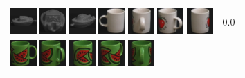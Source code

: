 \begin{figure}[tbp]
\begin{center}
\begin{tabular}{m{11cm} | m{3cm} |}
\includegraphics[width=1cm]{coil/beeld-27.eps}
\includegraphics[width=1cm]{coil/beeld-26.eps}
\includegraphics[width=1cm]{coil/beeld-29.eps}
\includegraphics[width=1cm]{coil/beeld-37.eps}
\includegraphics[width=1cm]{coil/beeld-41.eps}
\includegraphics[width=1cm]{coil/beeld-40.eps}
\includegraphics[width=1cm]{coil/beeld-38.eps}
& {\scriptsize 0.0}
\\
\includegraphics[width=1cm]{coil/beeld-30.eps}
\includegraphics[width=1cm]{coil/beeld-34.eps}
\includegraphics[width=1cm]{coil/beeld-32.eps}
\includegraphics[width=1cm]{coil/beeld-33.eps}
\includegraphics[width=1cm]{coil/beeld-35.eps}

\end{tabular}
\end{center}
\end{figure}
